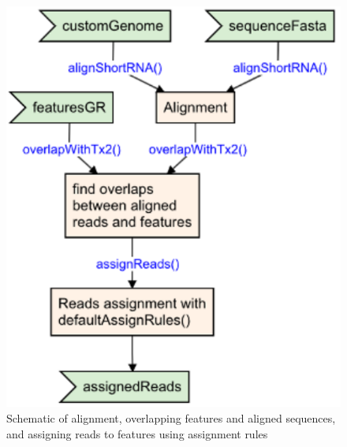 \documentclass[12pt,twoside]{reedthesis}
\begin{document}
\begin{figure}[h]

{\centering \includegraphics{thesis_files/figure-latex/3f7-1} 

}

\caption{Schematic of alignment, overlapping features and aligned sequences, and assigning reads to features using assignment rules}\label{fig:3f7}
\end{figure}
\end{document}
